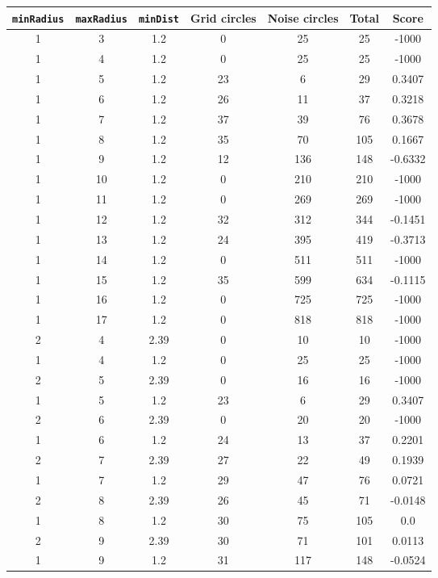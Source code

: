 \documentclass[letterpaper, 12pt]{article}
\begin{document}
\begin{longtable}{|c|c|c|c|c|c|c|}
\hline
\textbf{\texttt{minRadius}} & \textbf{\texttt{maxRadius}} & \textbf{\texttt{minDist}} & \textbf{Grid circles} & \textbf{Noise circles} & \textbf{Total} & \textbf{Score} \\
\hline
1 & 3 & 1.2 & 0 & 25 & 25 & -1000 \\
\hline
1 & 4 & 1.2 & 0 & 25 & 25 & -1000 \\
\hline
1 & 5 & 1.2 & 23 & 6 & 29 & 0.3407 \\
\hline
1 & 6 & 1.2 & 26 & 11 & 37 & 0.3218 \\
\hline
1 & 7 & 1.2 & 37 & 39 & 76 & 0.3678 \\
\hline
1 & 8 & 1.2 & 35 & 70 & 105 & 0.1667 \\
\hline
1 & 9 & 1.2 & 12 & 136 & 148 & -0.6332 \\
\hline
1 & 10 & 1.2 & 0 & 210 & 210 & -1000 \\
\hline
1 & 11 & 1.2 & 0 & 269 & 269 & -1000 \\
\hline
1 & 12 & 1.2 & 32 & 312 & 344 & -0.1451 \\
\hline
1 & 13 & 1.2 & 24 & 395 & 419 & -0.3713 \\
\hline
1 & 14 & 1.2 & 0 & 511 & 511 & -1000 \\
\hline
1 & 15 & 1.2 & 35 & 599 & 634 & -0.1115 \\
\hline
1 & 16 & 1.2 & 0 & 725 & 725 & -1000 \\
\hline
1 & 17 & 1.2 & 0 & 818 & 818 & -1000 \\
\hline
2 & 4 & 2.39 & 0 & 10 & 10 & -1000 \\
\hline
1 & 4 & 1.2 & 0 & 25 & 25 & -1000 \\
\hline
2 & 5 & 2.39 & 0 & 16 & 16 & -1000 \\
\hline
1 & 5 & 1.2 & 23 & 6 & 29 & 0.3407 \\
\hline
2 & 6 & 2.39 & 0 & 20 & 20 & -1000 \\
\hline
1 & 6 & 1.2 & 24 & 13 & 37 & 0.2201 \\
\hline
2 & 7 & 2.39 & 27 & 22 & 49 & 0.1939 \\
\hline
1 & 7 & 1.2 & 29 & 47 & 76 & 0.0721 \\
\hline
2 & 8 & 2.39 & 26 & 45 & 71 & -0.0148 \\
\hline
1 & 8 & 1.2 & 30 & 75 & 105 & 0.0 \\
\hline
2 & 9 & 2.39 & 30 & 71 & 101 & 0.0113 \\
\hline
1 & 9 & 1.2 & 31 & 117 & 148 & -0.0524 \\

\end{longtable}
\end{document}
